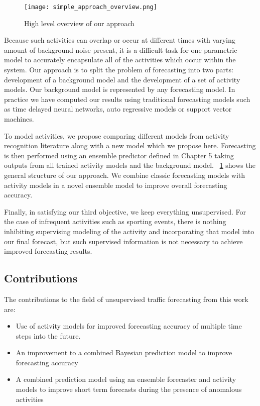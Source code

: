 \begin{figure}
	\centering
	\texttt{[image: simple\_approach\_overview.png]}
	\caption{High level overview of our approach}
	\label{fig:alg_overview}
\end{figure}


Because such activities can overlap or occur at different times with varying amount of background noise present, it is a difficult task for one parametric model to accurately encapsulate all of the activities which occur within the system.  Our approach is to split the problem of forecasting into two parts: development of a background model and the development of a set of activity models.  Our background model is represented by any forecasting model.  In practice we have computed our results using traditional forecasting models such as time delayed neural networks, auto regressive models or support vector machines.   

To model activities, we propose comparing different models from activity recognition literature along with a new model which we propose here.  Forecasting is then performed using an ensemble predictor defined in Chapter 5 taking outputs from all trained activity models and the background model.  ~\ref{fig:alg_overview} shows the general structure of our approach.  We combine classic forecasting models with activity models in a novel ensemble model to improve overall forecasting accuracy.

Finally, in satisfying our third objective, we keep everything unsupervised.  For the case of infrequent activities such as sporting events, there is nothing inhibiting supervising modeling of the activity and incorporating that model into our final forecast, but such supervised information is not necessary to achieve improved forecasting results.


\subsection{Contributions}  
The contributions to the field of unsupervised traffic forecasting from this work are:
\begin{itemize}
\item{Use of activity models for improved forecasting accuracy of multiple time steps into the future.}
\item{An improvement to a combined Bayesian prediction model to improve forecasting accuracy}
\item{A combined prediction model using an ensemble forecaster and activity models to improve short term forecasts during the presence of anomalous activities}
\end{itemize}

